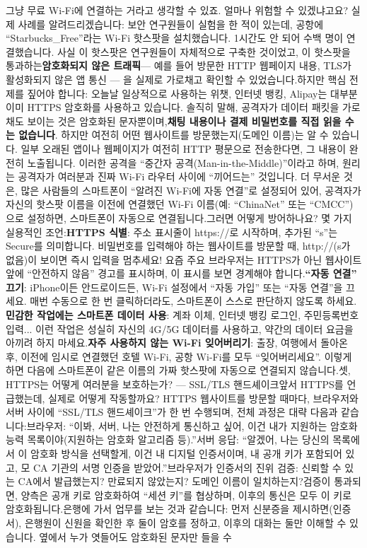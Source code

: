 
그냥 무료 Wi-Fi에 연결하는 거라고 생각할 수 있죠. 얼마나 위험할 수 있겠냐고요? 실제 사례를 알려드리겠습니다: 보안 연구원들이 실험을 한 적이 있는데, 공항에 “Starbucks\_Free”라는 Wi-Fi 핫스팟을 설치했습니다. 1시간도 안 되어 수백 명이 연결했습니다. 사실 이 핫스팟은 연구원들이 자체적으로 구축한 것이었고, 이 핫스팟을 통과하는\textbf{암호화되지 않은 트래픽}— 예를 들어 방문한 HTTP 웹페이지 내용, TLS가 활성화되지 않은 앱 통신 — 을 실제로 가로채고 확인할 수 있었습니다.하지만 핵심 전제를 짚어야 합니다: 오늘날 일상적으로 사용하는 위챗, 인터넷 뱅킹, Alipay는 대부분 이미 HTTPS 암호화를 사용하고 있습니다. 솔직히 말해, 공격자가 데이터 패킷을 가로채도 보이는 것은 암호화된 문자뿐이며,\textbf{채팅 내용이나 결제 비밀번호를 직접 읽을 수는 없습니다}. 하지만 여전히 어떤 웹사이트를 방문했는지(도메인 이름)는 알 수 있습니다. 일부 오래된 앱이나 웹페이지가 여전히 HTTP 평문으로 전송한다면, 그 내용이 완전히 노출됩니다. 이러한 공격을 “중간자 공격(Man-in-the-Middle)”이라고 하며, 원리는 공격자가 여러분과 진짜 Wi-Fi 라우터 사이에 “끼어드는” 것입니다. 더 무서운 것은, 많은 사람들의 스마트폰이 “알려진 Wi-Fi에 자동 연결”로 설정되어 있어, 공격자가 자신의 핫스팟 이름을 이전에 연결했던 Wi-Fi 이름(예: “ChinaNet” 또는 “CMCC”)으로 설정하면, 스마트폰이 자동으로 연결됩니다.그러면 어떻게 방어하나요? 몇 가지 실용적인 조언:\textbf{HTTPS 식별}: 주소 표시줄이 https://로 시작하며, 추가된 “s”는 Secure를 의미합니다. 비밀번호를 입력해야 하는 웹사이트를 방문할 때, http://(s가 없음)이 보이면 즉시 입력을 멈추세요! 요즘 주요 브라우저는 HTTPS가 아닌 웹사이트 앞에 “안전하지 않음” 경고를 표시하며, 이 표시를 보면 경계해야 합니다.\textbf{“자동 연결” 끄기}: iPhone이든 안드로이드든, Wi-Fi 설정에서 “자동 가입” 또는 “자동 연결”을 끄세요. 매번 수동으로 한 번 클릭하더라도, 스마트폰이 스스로 판단하지 않도록 하세요.\textbf{민감한 작업에는 스마트폰 데이터 사용}: 계좌 이체, 인터넷 뱅킹 로그인, 주민등록번호 입력... 이런 작업은 성실히 자신의 4G/5G 데이터를 사용하고, 약간의 데이터 요금을 아끼려 하지 마세요.\textbf{자주 사용하지 않는 Wi-Fi 잊어버리기}: 출장, 여행에서 돌아온 후, 이전에 임시로 연결했던 호텔 Wi-Fi, 공항 Wi-Fi를 모두 “잊어버리세요”. 이렇게 하면 다음에 스마트폰이 같은 이름의 가짜 핫스팟에 자동으로 연결되지 않습니다.셋, HTTPS는 어떻게 여러분을 보호하는가? — SSL/TLS 핸드셰이크앞서 HTTPS를 언급했는데, 실제로 어떻게 작동할까요? HTTPS 웹사이트를 방문할 때마다, 브라우저와 서버 사이에 “SSL/TLS 핸드셰이크”가 한 번 수행되며, 전체 과정은 대략 다음과 같습니다:브라우저: “이봐, 서버, 나는 안전하게 통신하고 싶어, 이건 내가 지원하는 암호화 능력 목록이야(지원하는 암호화 알고리즘 등).”서버 응답: “알겠어, 나는 당신의 목록에서 이 암호화 방식을 선택할게, 이건 내 디지털 인증서이며, 내 공개 키가 포함되어 있고, 모 CA 기관의 서명 인증을 받았어.”브라우저가 인증서의 진위 검증: 신뢰할 수 있는 CA에서 발급했는지? 만료되지 않았는지? 도메인 이름이 일치하는지?검증이 통과되면, 양측은 공개 키로 암호화하여 “세션 키”를 협상하며, 이후의 통신은 모두 이 키로 암호화됩니다.은행에 가서 업무를 보는 것과 같습니다: 먼저 신분증을 제시하면(인증서), 은행원이 신원을 확인한 후 둘이 암호를 정하고, 이후의 대화는 둘만 이해할 수 있습니다. 옆에서 누가 엿들어도 암호화된 문자만 들을 수 